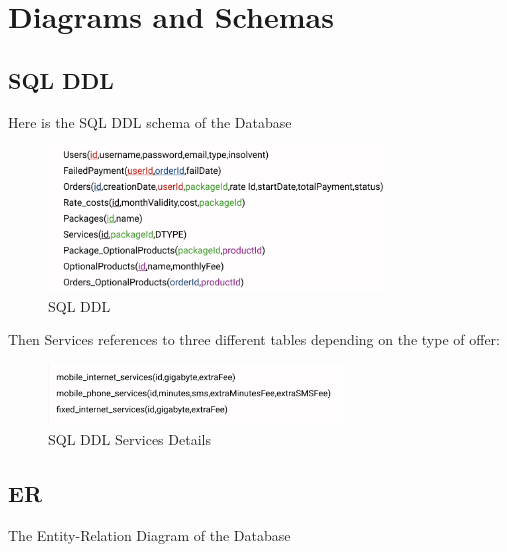\documentclass{article}
\begin{document}
\section{Diagrams and Schemas}

\subsection{SQL DDL}
Here is the SQL DDL schema of the Database

\begin{figure}[hbt!]
\centering
\includegraphics[width=0.80\textwidth]{sqlDDL.png}
\caption{SQL DDL}
\end{figure}
\newpage

Then Services references to three different tables depending on the type of offer:

\begin{figure}[hbt!]
\centering
\includegraphics[width=0.70\textwidth]{sqlServicesDDL.png}
\caption{SQL DDL Services Details}
\label{fig:services}
\end{figure}
\subsection{ER}
The Entity-Relation Diagram of the Database
\end{document}
